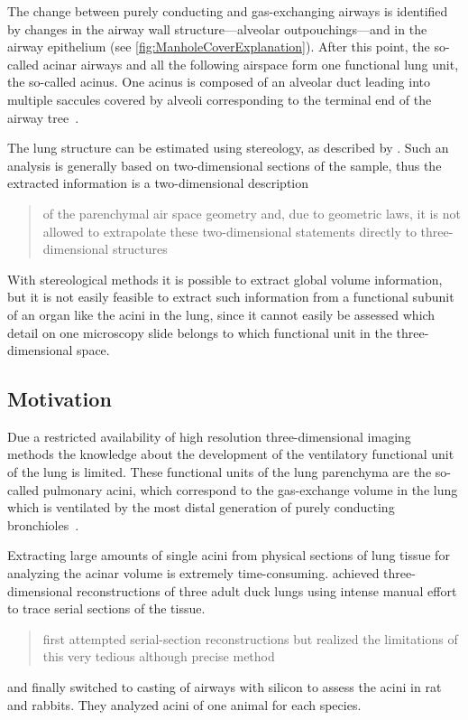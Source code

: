 \documentclass[a4paper,DIV=calc,abstract,english]{scrartcl}
\begin{document}
The change between purely conducting and gas-exchanging airways is identified by changes in the airway wall structure---alveolar outpouchings---and in the airway epithelium (see \autoref{fig:ManholeCoverExplanation}).
After this point, the so-called acinar airways and all the following airspace form one functional lung unit, the so-called acinus.
One acinus is composed of an alveolar duct leading into multiple saccules covered by alveoli corresponding to the terminal end of the airway tree~\cite{Schittny2007a}.

The lung structure can be estimated using stereology, as described by \citet{Hsia2010}.
Such an analysis is generally based on two-dimensional sections of the sample, thus the extracted information is a two-dimensional description \blockquote[\citet{Tschanz2002}]{of the parenchymal air space geometry and, due to geometric laws, it is not allowed to extrapolate these two-dimensional statements directly to three-dimensional structures}.
With stereological methods it is possible to extract global volume information, but it is not easily feasible to extract such information from a functional subunit of an organ like the acini in the lung, since it cannot easily be assessed which detail on one microscopy slide belongs to which functional unit in the three-dimensional space.

\subsection{Motivation}
Due a restricted availability of high resolution three-dimensional imaging methods the knowledge about the development of the ventilatory functional unit of the lung is limited.
These functional units of the lung parenchyma are the so-called pulmonary acini, which correspond to the gas-exchange volume in the lung which is ventilated by the most distal generation of purely conducting bronchioles~\cite{Rodriguez1987}.

Extracting large amounts of single acini from physical sections of lung tissue for analyzing the acinar volume is extremely time-consuming.
\citet{Woodward2005} achieved three-dimensional reconstructions of three adult duck lungs using intense manual effort to trace serial sections of the tissue.
\citet{Rodriguez1987} \blockquote{first attempted serial-section reconstructions but realized the limitations of this very tedious although precise method} and finally switched to casting of airways with silicon to assess the acini in rat and rabbits. They analyzed acini of one animal for each species.
\end{document}
